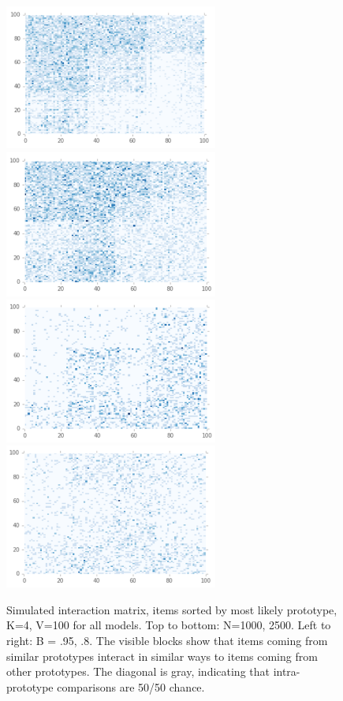 \begin{figure}[!htb]
\includegraphics[width=	7cm]{images/10k_5a_95b}
\hfill
\includegraphics[width=7cm]{images/10k_5a_8b}
\includegraphics[width=	7cm]{images/2k_5a_95b}
\hfill
\includegraphics[width=7cm]{images/2k_5a_8b}
\caption{Simulated interaction matrix, items sorted by most likely prototype, K=4, V=100 for all models. Top to bottom: N=1000, 2500. Left to right: B = .95, .8. The visible blocks show that items coming from similar prototypes interact in similar ways to items coming from other prototypes. The diagonal is gray, indicating that intra-prototype comparisons are 50/50 chance.}
\label{fig:interactions_all} 
\end{figure}


